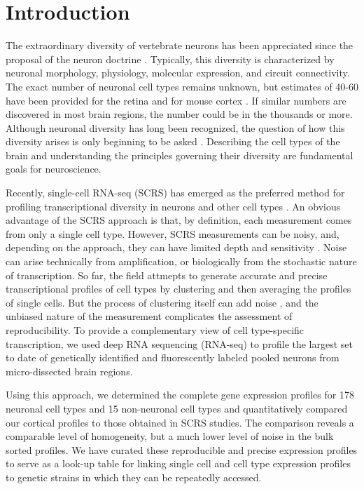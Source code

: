 \section*{Introduction}

The extraordinary diversity of vertebrate neurons has been appreciated since the proposal of the neuron doctrine \cite{0195074017}. Typically, this diversity is characterized by neuronal morphology, physiology, molecular expression, and circuit connectivity. The exact number of neuronal cell types remains unknown, but estimates of 40-60 have been provided for the retina \cite{Macosko_2015,Masland_2004} and for mouse cortex \cite{Tasic_2016,Zeisel_2015}. If similar numbers are discovered in most brain regions, the number could be in the thousands or more. Although neuronal diversity has long been recognized, the question of how this diversity arises is only beginning to be asked \cite{Arendt_2008,Muotri_2006}. Describing the cell types of the brain and understanding the principles governing their diversity are fundamental goals for neuroscience.

Recently, single-cell RNA-seq (SCRS) has emerged as the preferred method for profiling transcriptional diversity in neurons and other cell types \cite{Shapiro_2013}. An obvious advantage of the SCRS approach is that, by definition, each measurement comes from only a single cell type. However, SCRS measurements can be noisy, and, depending on the approach, they can have limited depth and sensitivity \cite{Parekh_2016,Svensson_2017}. Noise can arise technically from amplification, or biologically from the stochastic nature of transcription. So far, the field attmepts to generate accurate and precise transcriptional profiles of cell types by clustering and then averaging the profiles of single cells. But the process of clustering itself can add noise \cite{Ntranos_2016}, and the unbiased nature of the measurement complicates the assessment of reproducibility. To provide a complementary view of cell type-specific transcription, we used deep RNA sequencing (RNA-seq) to profile the largest set to date of genetically identified and fluorescently labeled pooled neurons from micro-dissected brain regions.

Using this approach, we determined the complete gene expression profiles for 178 neuronal cell types and 15 non-neuronal cell types and quantitatively compared our cortical profiles to those obtained in SCRS studies. The comparison reveals a comparable level of homogeneity, but a much lower level of noise in the bulk sorted profiles. We have curated these reproducible and precise expression profiles to serve as a look-up table for linking single cell and cell type expression profiles to genetic strains in which they can be repeatedly accessed. 

